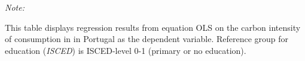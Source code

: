\begin{table}[htbp!]
\begin{adjustbox}{width = 1\textwidth, max height = 0.95\textheight, center}
\begin{threeparttable}[b]
         \begin{tablenotes}\item \medskip \textit{Note:}
            \item This table displays regression results from equation OLS on the carbon intensity of consumption in  in Portugal as the dependent variable. Reference group for education (\textit{ISCED}) is ISCED-level 0-1 (primary or no education).
         \end{tablenotes}
      \end{threeparttable}
   \end{adjustbox}
\end{table}


